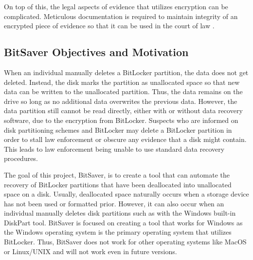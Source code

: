 \documentclass[conference]{IEEEtran} \IEEEoverridecommandlockouts
\begin{document}
On top of this, the legal aspects of evidence that utilizes encryption can be
complicated. Meticulous documentation is required to maintain integrity of an
encrypted piece of evidence so that it can be used in the court of law \cite{b5}.

\subsection{BitSaver Objectives and Motivation} When an individual manually
deletes a BitLocker partition, the data does not get deleted. Instead, the disk
marks the partition as unallocated space so that new data can be written to the unallocated partition.
Thus, the data remains on the drive so long as no additional data overwrites the previous data.
However, the data partition still cannot be read directly, either with or without data recovery software,
due to the encryption from BitLocker. Suspects who are
informed on disk partitioning schemes and BitLocker may delete a BitLocker partition in order
to stall law enforcement or obscure any evidence that a disk might contain. This leads to law enforcement
being unable to use standard data recovery procedures.

The goal of this project, BitSaver, is to create a tool that can automate the recovery of
BitLocker partitions that have been deallocated into unallocated space on a disk.
Usually, deallocated space naturally occurs when a storage device has not been used or formatted prior.
However, it can also occur when an individual manually deletes disk partitions such
as with the Windows built-in DiskPart tool. BitSaver is focused on creating a tool that works for
Windows as the Windows operating system is the primary operating system that utilizes BitLocker. Thus,
BitSaver does not work for other operating systems like MacOS or Linux/UNIX and will not work even in
future versions.
\end{document}
